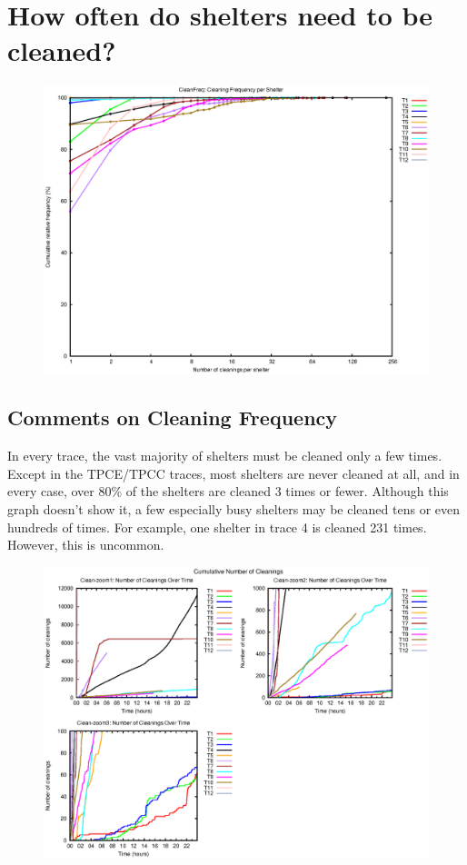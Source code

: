 \documentclass[10pt]{article}
\begin{document}
\section{How often do shelters need to be cleaned?}

\begin{figure}
\includegraphics[scale=2, width=\textwidth]{freq.eps}
\end{figure}


\subsection{Comments on Cleaning Frequency}
In every trace, the vast majority of shelters must be cleaned only a few times. 
Except in the TPCE/TPCC traces, most shelters are never cleaned at all,
and in every case, over 80\% of the shelters are cleaned 3 times or fewer.
Although this graph doesn't show it,  a few especially busy shelters 
may be cleaned tens or even hundreds of times.
For example, one shelter in trace 4 is cleaned 231 times. 
However, this is uncommon.

\clearpage

\begin{figure}
\includegraphics[scale=2, width=\textwidth]{cum_freq.eps}
\end{figure}
\end{document}
